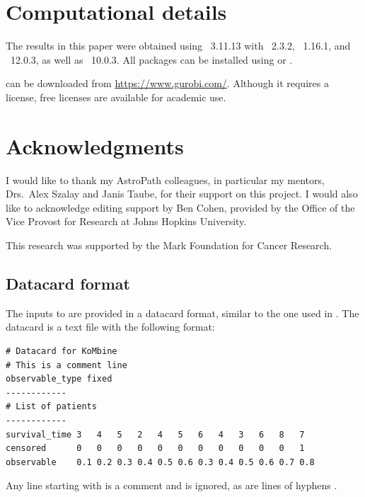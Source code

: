 \documentclass[article]{jss}
\begin{document}
\section*{Computational details}

The results in this paper were obtained using ~3.11.13 with ~2.3.2, ~1.16.1, and ~12.0.3, as well as ~10.0.3. All  packages can be installed using  or .

 can be downloaded from \url{https://www.gurobi.com/}. Although it requires a license, free licenses are available for academic use.

\section*{Acknowledgments}

I would like to thank my AstroPath colleagues, in particular my mentors, Drs.~Alex Szalay and Janis Taube, for their support on this project. I would also like to acknowledge editing support by Ben Cohen, provided by the Office of the Vice Provost for Research at Johns Hopkins University.

This research was supported by the Mark Foundation for Cancer Research.






\newpage

\begin{appendix}

\section{Datacard format}\label{app:datacard}

The inputs to  are provided in a datacard format, similar to the one used in  \citep{CAT-23-001}. The datacard is a text file with the following format:
\begin{verbatim}
# Datacard for KoMbine
# This is a comment line
observable_type fixed
------------
# List of patients
------------
survival_time 3   4   5   2   4   5   6   4   3   6   8   7
censored      0   0   0   0   0   0   0   0   0   0   0   1
observable    0.1 0.2 0.3 0.4 0.5 0.6 0.3 0.4 0.5 0.6 0.7 0.8
\end{verbatim}
\end{appendix}
Any line starting with \code{\#} is a comment and is ignored, as are lines of hyphens \code{------------}.
\end{document}

